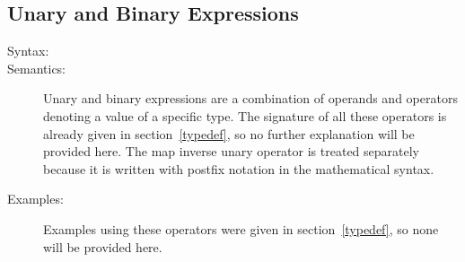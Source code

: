 \documentclass[\pformat,12pt]{article}
\begin{document}
\subsection{Unary and Binary Expressions}\label{unandbin}

\begin{description}
\item[Syntax:]







\item[Semantics:] Unary and binary expressions are a combination of
  operands and operators denoting a value of a specific type. The
  signature of all these operators is already given in
  section~\ref{typedef}, so no further explanation will be provided
  here. The map inverse unary operator is treated separately because
  it is written with postfix notation in the mathematical syntax.

\item[Examples:] Examples using these operators were given in
  section~\ref{typedef}, so none will be provided here.
\end{description}
\end{document}
